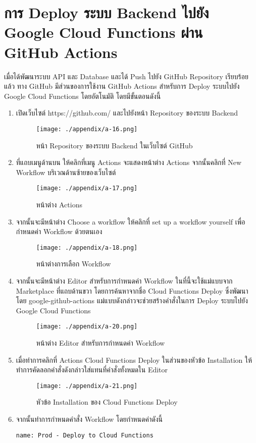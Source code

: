 \section{การ Deploy ระบบ Backend ไปยัง Google Cloud Functions ผ่าน GitHub Actions}
เมื่อได้พัฒนาระบบ API และ Database และได้ Push ไปยัง GitHub Repository เรียบร้อยแล้ว ทาง GitHub มีส่วนของการใช้งาน GitHub Actions สำหรับการ Deploy ระบบไปยัง Google Cloud Functions โดยอัตโนมัติ โดยมีขั้นตอนดังนี้
\begin{enumerate}
    \item เปิดเว็บไซต์ https://github.com/ และไปยังหน้า Repository ของระบบ Backend
    \begin{figure}
        \texttt{[image: ./appendix/a-16.png]}
        \caption{หน้า Repository ของระบบ Backend ในเว็บไซต์ GitHub}
    \end{figure}
    \item ที่แถบเมนูด้านบน ให้คลิกที่เมนู Actions จะแสดงหน้าต่าง Actions จากนั้นคลิกที่ New Workflow บริเวณด้านซ้ายของเว็บไซต์
    \begin{figure}
        \texttt{[image: ./appendix/a-17.png]}
        \caption{หน้าต่าง Actions}
    \end{figure}
    \item จากนั้นจะมีหน้าต่าง Choose a workflow ให้คลิกที่ set up a workflow yourself เพื่อกำหนดค่า Workflow ด้วยตนเอง
    \begin{figure}
        \texttt{[image: ./appendix/a-18.png]}
        \caption{หน้าต่างการเลือก Workflow}
    \end{figure}
    \item จากนั้นจะมีหน้าต่าง Editor สำหรับการกำหนดค่า Workflow ในที่นี้จะใช้แม่แบบจาก Marketplace ที่แถบด้านขวา โดยการค้นหาจากชื่อ Cloud Functions Deploy ซึ่งพัฒนาโดย google-github-actions แม่แบบดังกล่าวจะช่วยสร้างคำสั่งในการ Deploy ระบบไปยัง Google Cloud Functions
    \begin{figure}
        \texttt{[image: ./appendix/a-20.png]}
        \caption{หน้าต่าง Editor สำหรับการกำหนดค่า Workflow}
    \end{figure}
    \item เมื่อทำการคลิกที่ Actions Cloud Functions Deploy ในส่วนของหัวข้อ Installation ให้ทำการคัดลอกคำสั่งดังกล่าวใส่แทนที่คำสั่งทั้งหมดใน Editor
    \begin{figure}
        \texttt{[image: ./appendix/a-21.png]}
        \caption{หัวข้อ Installation ของ Cloud Functions Deploy}
    \end{figure}
    \item จากนั้นทำการกำหนดคำสั่ง Workflow โดยกำหนดค่าดังนี้
    \begin{lstlisting}[caption=คำสั่ง Workflow การ Deploy ระบบไปยัง Google Cloud Functions โดยอัตโนมัติ]
name: Prod - Deploy to Cloud Functions


\end{lstlisting}
\end{enumerate}
